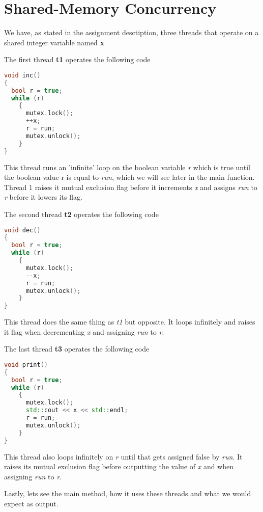 \section{Shared-Memory Concurrency}

We have, as stated in the assignment desctiption, three threads that 
operate on a shared integer variable named \textbf{x}

The first thread \textbf{t1} operates the following code

\begin{lstlisting}[language=C++, caption=Thread 1 source code]
void inc()
{
  bool r = true;
  while (r)
    {
      mutex.lock();
      ++x;
      r = run;
      mutex.unlock();
    }
}
\end{lstlisting}

This thread runs an 'infinite' loop on the boolean variable \textit{r} which is
true until the boolean value r is equal to \textit{run}, which we will see later
in the main function. Thread 1 raises it mutual exclusion flag before it increments
\textit{x} and assigns \textit{run} to \textit{r} before it lowers its flag.

The second thread \textbf{t2} operates the following code

\begin{lstlisting}[language=C++, caption=Thread 2 source code]
void dec()
{
  bool r = true;
  while (r)
    {
      mutex.lock();
      --x;
      r = run;
      mutex.unlock();
    }
}
\end{lstlisting}
This thread does the same thing as \textit{t1} but opposite. It loops infinitely
and raises it flag when decrementing \textit{x} and assigning \textit{run} to 
\textit{r}.  

The last thread \textbf{t3} operates the following code

\begin{lstlisting}[language=C++, caption=Thread 3 source code]
void print()
{
  bool r = true;
  while (r)
    {
      mutex.lock();
      std::cout << x << std::endl;
      r = run;
      mutex.unlock();
    }
}
\end{lstlisting}

This thread also loops infinitely on \textit{r} until that gets assigned false
by \textit{run}. It raises its mutual exclusion flag before outputting the value
of \textit{x} and when assigning \textit{run} to \textit{r}.

Lastly, lets see the main method, how it uses these threads and what we would
expect as output. 

